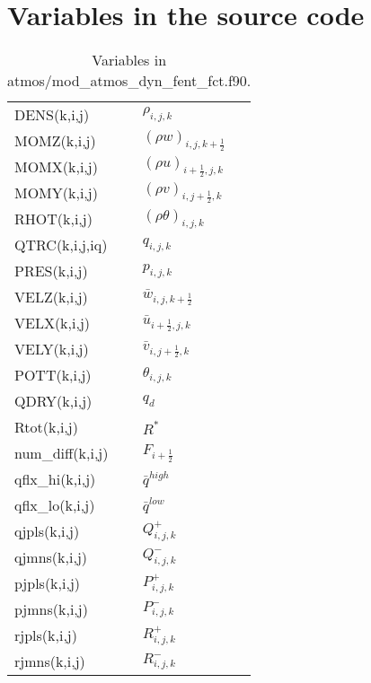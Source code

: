 \chapter{Variables in the source code}


\begin{table}[htbp]
  \caption{Variables in atmos/mod\_atmos\_dyn\_fent\_fct.f90.}
  \begin{tabular}{ll}\hline
    DENS(k,i,j) & $\rho_{i,j,k}$ \\
    MOMZ(k,i,j) & $(\rho w)_{i,j,k+\frac{1}{2}}$ \\
    MOMX(k,i,j) & $(\rho u)_{i+\frac{1}{2},j,k}$ \\
    MOMY(k,i,j) & $(\rho v)_{i,j+\frac{1}{2},k}$ \\
    RHOT(k,i,j) & $(\rho\theta)_{i,j,k}$ \\
    QTRC(k,i,j,iq) & $q_{i,j,k}$ \\
    PRES(k,i,j) & $p_{i,j,k}$ \\
    VELZ(k,i,j) & $\bar{w}_{i,j,k+\frac{1}{2}}$ \\
    VELX(k,i,j) & $\bar{u}_{i+\frac{1}{2},j,k}$ \\
    VELY(k,i,j) & $\bar{v}_{i,j+\frac{1}{2},k}$ \\
    POTT(k,i,j) & $\theta_{i,j,k}$ \\
    QDRY(k,i,j) & $q_d$ \\
    Rtot(k,i,j) & $R^*$ \\
    num\_diff(k,i,j) & $F_{i+\frac{1}{2}}$ \\
    qflx\_hi(k,i,j) & $\bar{q}^{high}$ \\
    qflx\_lo(k,i,j) & $\bar{q}^{low}$ \\
    qjpls(k,i,j) & $Q^+_{i,j,k}$ \\
    qjmns(k,i,j) & $Q^-_{i,j,k}$ \\
    pjpls(k,i,j) & $P^+_{i,j,k}$ \\
    pjmns(k,i,j) & $P^-_{i,j,k}$ \\
    rjpls(k,i,j) & $R^+_{i,j,k}$ \\
    rjmns(k,i,j) & $R^-_{i,j,k}$ \\
  \hline\end{tabular}
\end{table}


